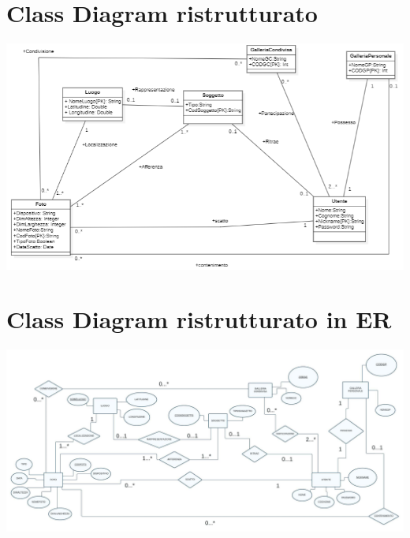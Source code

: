 \section{Class Diagram ristrutturato}
    \includegraphics{immagini/MCR.png}

\section{Class Diagram ristrutturato in ER}
\includegraphics[width=1.4\textwidth]{immagini/Galleria Fotografica Geocalizzata .jpg}